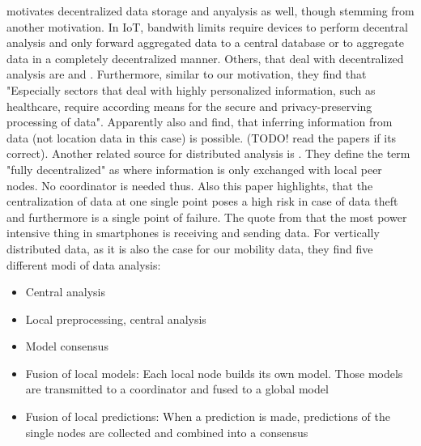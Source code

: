 \parencite{iot} motivates decentralized data storage and anyalysis as well, though stemming from another motivation. In IoT, bandwith limits require devices to perform decentral analysis and only forward aggregated data to a central database or to aggregate data in a completely decentralized manner. Others, that deal with decentralized analysis are \parencite{bin2010research} and \parencite{tsai2014data}. Furthermore, similar to our motivation, they find that "Especially sectors that deal with highly personalized information, such as healthcare, require according means for the secure and privacy-preserving processing of data". Apparently also \parencite{thrun2004advances} and \parencite{stolpe2011learning} find, that inferring information from data (not location data in this case) is possible. (TODO! read the papers if its correct). Another related source for distributed analysis is \parencite{das2010local}. They define the term "fully decentralized" as where information is only exchanged with local peer nodes. No coordinator is needed thus. Also this paper highlights, that the centralization of data at one single point poses a high risk in case of data theft and furthermore is a single point of failure. The quote from \parencite{carroll2010analysis} that the most power intensive thing in smartphones is receiving and sending data.
For vertically distributed data, as it is also the case for our mobility data, they find five different modi of data analysis:
\begin{itemize}
	\item Central analysis
	\item Local preprocessing, central analysis
	\item Model consensus
	\item Fusion of local models: Each local node builds its own model. Those models are transmitted to a coordinator and fused to a global model
	\item Fusion of local predictions: When a prediction is made, predictions of the single nodes are collected and combined into a consensus
\end{itemize}

